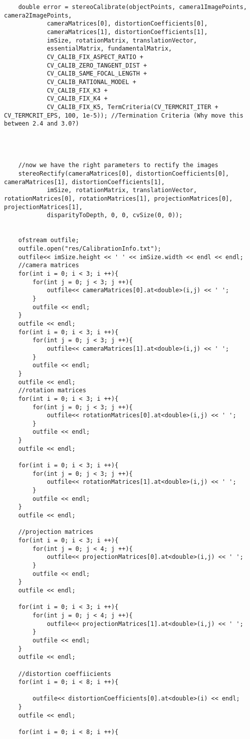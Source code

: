 \begin{verbatim}
	double error = stereoCalibrate(objectPoints, camera1ImagePoints, camera2ImagePoints,
			cameraMatrices[0], distortionCoefficients[0],
			cameraMatrices[1], distortionCoefficients[1],
			imSize, rotationMatrix, translationVector,
			essentialMatrix, fundamentalMatrix,
			CV_CALIB_FIX_ASPECT_RATIO +
			CV_CALIB_ZERO_TANGENT_DIST +
			CV_CALIB_SAME_FOCAL_LENGTH +
			CV_CALIB_RATIONAL_MODEL +
			CV_CALIB_FIX_K3 +
			CV_CALIB_FIX_K4 +
			CV_CALIB_FIX_K5, TermCriteria(CV_TERMCRIT_ITER + CV_TERMCRIT_EPS, 100, 1e-5)); //Termination Criteria (Why move this between 2.4 and 3.0?)




	//now we have the right parameters to rectify the images
	stereoRectify(cameraMatrices[0], distortionCoefficients[0], cameraMatrices[1], distortionCoefficients[1],
			imSize, rotationMatrix, translationVector, rotationMatrices[0], rotationMatrices[1], projectionMatrices[0], projectionMatrices[1],
			disparityToDepth, 0, 0, cvSize(0, 0));


	ofstream outfile;
	outfile.open("res/CalibrationInfo.txt");
	outfile<< imSize.height << ' ' << imSize.width << endl << endl;
	//camera matrices
	for(int i = 0; i < 3; i ++){
		for(int j = 0; j < 3; j ++){
			outfile<< cameraMatrices[0].at<double>(i,j) << ' ';
		}
		outfile << endl;
	}
	outfile << endl;
	for(int i = 0; i < 3; i ++){
		for(int j = 0; j < 3; j ++){
			outfile<< cameraMatrices[1].at<double>(i,j) << ' ';
		}
		outfile << endl;
	}
	outfile << endl;
	//rotation matrices
	for(int i = 0; i < 3; i ++){
		for(int j = 0; j < 3; j ++){
			outfile<< rotationMatrices[0].at<double>(i,j) << ' ';
		}
		outfile << endl;
	}
	outfile << endl;

	for(int i = 0; i < 3; i ++){
		for(int j = 0; j < 3; j ++){
			outfile<< rotationMatrices[1].at<double>(i,j) << ' ';
		}
		outfile << endl;
	}
	outfile << endl;

	//projection matrices
	for(int i = 0; i < 3; i ++){
		for(int j = 0; j < 4; j ++){
			outfile<< projectionMatrices[0].at<double>(i,j) << ' ';
		}
		outfile << endl;
	}
	outfile << endl;

	for(int i = 0; i < 3; i ++){
		for(int j = 0; j < 4; j ++){
			outfile<< projectionMatrices[1].at<double>(i,j) << ' ';
		}
		outfile << endl;
	}
	outfile << endl;

	//distortion coeffiicients
	for(int i = 0; i < 8; i ++){

		outfile<< distortionCoefficients[0].at<double>(i) << endl;
	}
	outfile << endl;

	for(int i = 0; i < 8; i ++){


\end{verbatim}
